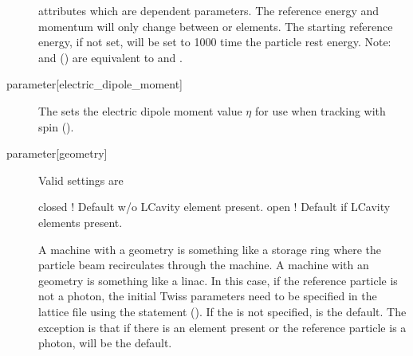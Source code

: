 \begin{description}
attributes which are dependent parameters. The reference energy and momentum will only change
between  or  elements. The starting reference energy, if not set, will be set
to 1000 time the particle rest energy.  Note:  and 
() are equivalent to  and .
%
  \item[{parameter[electric_dipole_moment]}] \Newline
The  sets the electric dipole moment value $\eta$ for use when tracking
with spin ().
%
  \item[{parameter[geometry]}] \Newline
Valid  settings are
\begin{example}
  closed  ! Default w/o LCavity element present.
  open    ! Default if LCavity elements present.
\end{example}
A machine with a  geometry is something like a storage ring where the particle beam
recirculates through the machine.  A machine with an  geometry is something like a linac.
In this case, if the reference particle is not a photon, the initial Twiss parameters need to be
specified in the lattice file using the  statement (). If the
 is not specified,  is the default. The exception is that if there is an
 element present or the reference particle is a photon,  will be the default.


\end{description}
